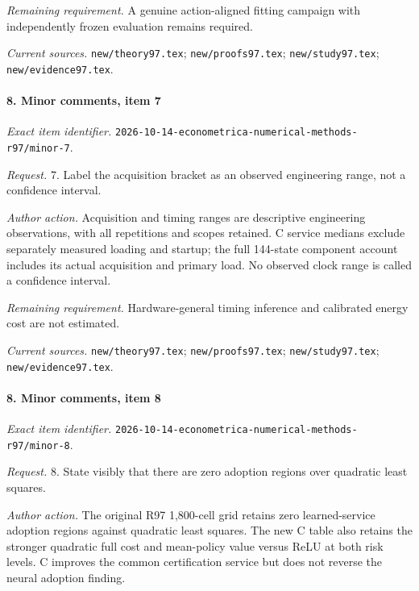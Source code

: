 \par\emph{Remaining requirement.} A genuine action-aligned fitting campaign with independently frozen evaluation remains required.

\par\emph{Current sources.} \nolinkurl{new/theory97.tex}; \nolinkurl{new/proofs97.tex}; \nolinkurl{new/study97.tex}; \nolinkurl{new/evidence97.tex}.

\paragraph{8. Minor comments, item 7}

\emph{Exact item identifier.} \nolinkurl{2026-10-14-econometrica-numerical-methods-r97/minor-7}.

\par\emph{Request.} 7. Label the acquisition bracket as an observed engineering range, not a confidence interval.

\par\emph{Author action.} Acquisition and timing ranges are descriptive engineering observations, with all repetitions and scopes retained. C service medians exclude separately measured loading and startup; the full 144-state component account includes its actual acquisition and primary load. No observed clock range is called a confidence interval.

\par\emph{Remaining requirement.} Hardware-general timing inference and calibrated energy cost are not estimated.

\par\emph{Current sources.} \nolinkurl{new/theory97.tex}; \nolinkurl{new/proofs97.tex}; \nolinkurl{new/study97.tex}; \nolinkurl{new/evidence97.tex}.

\paragraph{8. Minor comments, item 8}

\emph{Exact item identifier.} \nolinkurl{2026-10-14-econometrica-numerical-methods-r97/minor-8}.

\par\emph{Request.} 8. State visibly that there are zero adoption regions over quadratic least squares.

\par\emph{Author action.} The original R97 1,800-cell grid retains zero learned-service adoption regions against quadratic least squares. The new C table also retains the stronger quadratic full cost and mean-policy value versus ReLU at both risk levels. C improves the common certification service but does not reverse the neural adoption finding.


